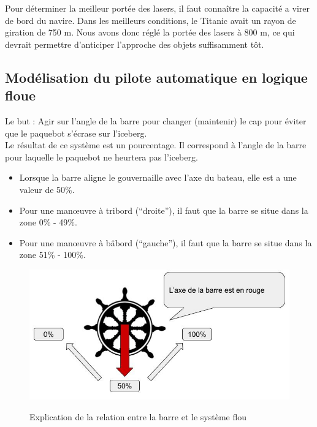\documentclass[a4paper,11pt]{article}
\begin{document}
    Pour déterminer la meilleur portée des lasers, il faut connaître la capacité a virer de bord du navire. Dans les meilleurs conditions, le Titanic avait un rayon de giration de 750 m. Nous avons donc réglé la portée des lasers à 800 m, ce qui devrait permettre d’anticiper l’approche des objets suffisamment tôt.

    \subsection{Modélisation du pilote automatique en logique floue}

    Le but : Agir sur l’angle de la barre pour changer (maintenir) le cap pour éviter que le paquebot s’écrase sur l’iceberg.\\
    Le résultat de ce système est un pourcentage. Il correspond à l’angle de la barre pour laquelle le paquebot ne heurtera pas l’iceberg.

    \begin{itemize}
        \item Lorsque la barre aligne le gouvernaille avec l’axe du bateau, elle est a une valeur de 50\%.
        \item Pour une manœuvre à tribord (“droite”), il faut que la barre se situe dans la zone 0\% - 49\%.
        \item Pour une manœuvre à bâbord (“gauche”), il faut que la barre se situe dans la zone 51\% - 100\%.
    \end{itemize}

    \begin{figure}[H]
        \begin{center}
            \caption{Explication de la relation entre la barre et le système flou}
            \includegraphics[scale=0.6]{assets/Explications_Barre.jpg}
            \label{fig:helpBar}
        \end{center}
    \end{figure}
\end{document}
